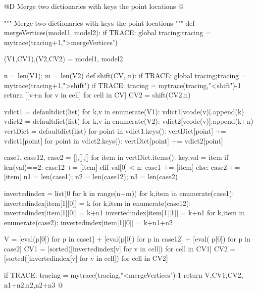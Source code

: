 \documentclass[11pt,oneside]{article}	%
\begin{document}
@D Merge two dictionaries with keys the point locations
@{""" Merge two dictionaries with keys the point locations """
def mergeVertices(model1, model2):
	if TRACE: global tracing;tracing = mytrace(tracing+1,">mergeVertices")

	(V1,CV1),(V2,CV2) = model1, model2

	n = len(V1); m = len(V2)
	def shift(CV, n): 
		if TRACE: global tracing;tracing = mytrace(tracing+1,">shift")
		if TRACE: tracing = mytrace(tracing,"<shift")-1
		return [[v+n for v in cell] for cell in CV]
	CV2 = shift(CV2,n)

	vdict1 = defaultdict(list)
	for k,v in enumerate(V1): vdict1[vcode(v)].append(k) 
	vdict2 = defaultdict(list)
	for k,v in enumerate(V2): vdict2[vcode(v)].append(k+n) 
	vertDict = defaultdict(list)
	for point in vdict1.keys(): vertDict[point] += vdict1[point]
	for point in vdict2.keys(): vertDict[point] += vdict2[point]

	case1, case12, case2 = [],[],[]
	for item in vertDict.items():
		key,val = item
		if len(val)==2:  case12 += [item]
		elif val[0] < n: case1 += [item]
		else: case2 += [item]
	n1 = len(case1); n2 = len(case12); n3 = len(case2)

	invertedindex = list(0 for k in range(n+m))
	for k,item in enumerate(case1):
		invertedindex[item[1][0]] = k
	for k,item in enumerate(case12):
		invertedindex[item[1][0]] = k+n1
		invertedindex[item[1][1]] = k+n1
	for k,item in enumerate(case2):
		invertedindex[item[1][0]] = k+n1+n2

	V = [eval(p[0]) for p in case1] + [eval(p[0]) for p in case12] + [eval(
				p[0]) for p in case2]
	CV1 = [sorted([invertedindex[v] for v in cell]) for cell in CV1]
	CV2 = [sorted([invertedindex[v] for v in cell]) for cell in CV2]


	if TRACE: tracing = mytrace(tracing,"<mergeVertices")-1
	return V,CV1,CV2, n1+n2,n2,n2+n3
@}
\end{document}
